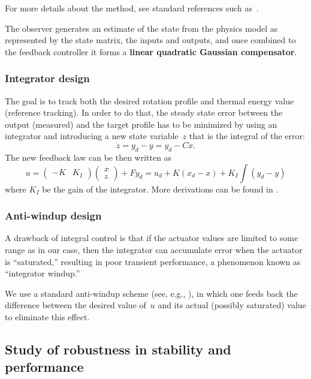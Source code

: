 \documentclass[12pt,lot, lof]{puthesis}
\begin{document}
For more details about the method, see standard references such as~\cite{SandP, AandM}.

The observer generates an estimate of the state from the physics model as represented by the state matrix, the inputs and outputs, and once combined to the feedback controller it forms a \textbf{linear quadratic Gaussian compensator}.

\subsubsection{Integrator design} 

The goal is to track both the desired rotation profile and thermal energy value (reference tracking). In order to do that, the steady state error between the output (measured) and the target profile has to be minimized by using an integrator and introducing a new state variable~$z$ that is the integral of the error:
\begin{equation}
	\dot{z} = y_{d} - y = y_{d} - C x.
	\label{integral}
\end{equation}
The new feedback law can be then written as
\begin{equation}
u = \left(\! \begin{array}{cc}  -K & K_I\end{array}\!\right) \left(\! \begin{array}{c}  x \\ z \end{array}\!\right) + F y_{d} 
   = u_d + K (x_d - x) + K_I \!\!\int (y_d - y)
\end{equation}
where $K_I$ be the gain of the integrator. More derivations can be found in \cite{Goumiri15}.

\subsubsection{Anti-windup design}
A drawback of integral control is that if the actuator values are limited to some range as in our case, then the integrator can accumulate error when the actuator is ``saturated,'' resulting in poor transient performance, a phenomenon known as ``integrator windup.'' 

We use a standard anti-windup scheme (see, e.g., \cite{AandM, Lewis}), in which one feeds back the difference between the desired value of~$u$ and its actual (possibly saturated) value to eliminate this effect.

\subsection{Study of robustness in stability and performance}
\end{document}
